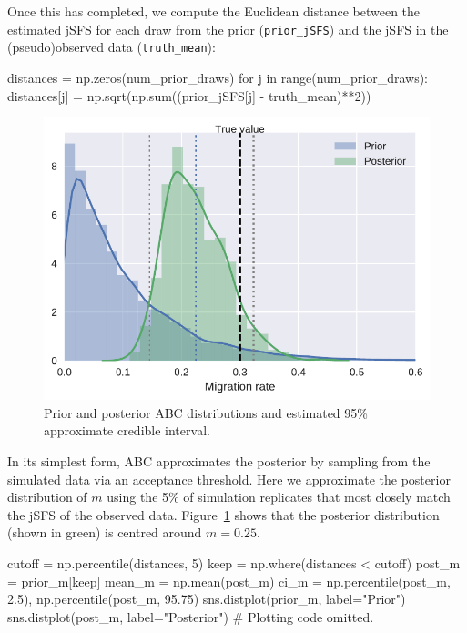 \documentclass[graybox]{svmult}
\begin{document}
Once this has completed, we compute the Euclidean distance between the estimated jSFS for each
draw from the prior (\texttt{prior\_jSFS}) and the jSFS in the (pseudo)observed
data (\texttt{truth\_mean}):
\begin{pythoncode}
distances = np.zeros(num_prior_draws)
for j in range(num_prior_draws):
    distances[j] = np.sqrt(np.sum((prior_jSFS[j] - truth_mean)**2))
\end{pythoncode}


\begin{figure}
    \begin{center}
    \includegraphics[width=\textwidth]{images/inference-example_13_0.pdf}
    \end{center}
    \caption{\label{fig:abc-posterior}Prior and posterior ABC distributions
    and estimated 95\% approximate credible interval.}
\end{figure}

    In its simplest form, ABC approximates the posterior by sampling from
the simulated data via an acceptance threshold. Here we approximate the
posterior distribution of \(m\) using the 5\% of simulation replicates
that most closely match the jSFS of the observed data.
Figure~\ref{fig:abc-posterior} shows that the posterior
distribution (shown in green) is centred around \(m=0.25\).
\begin{pythoncode}
cutoff = np.percentile(distances, 5)
keep = np.where(distances < cutoff)
post_m = prior_m[keep]
mean_m = np.mean(post_m)
ci_m = np.percentile(post_m, 2.5), np.percentile(post_m, 95.75)
sns.distplot(prior_m, label="Prior")
sns.distplot(post_m, label="Posterior")
# Plotting code omitted.
\end{pythoncode}
\end{document}
